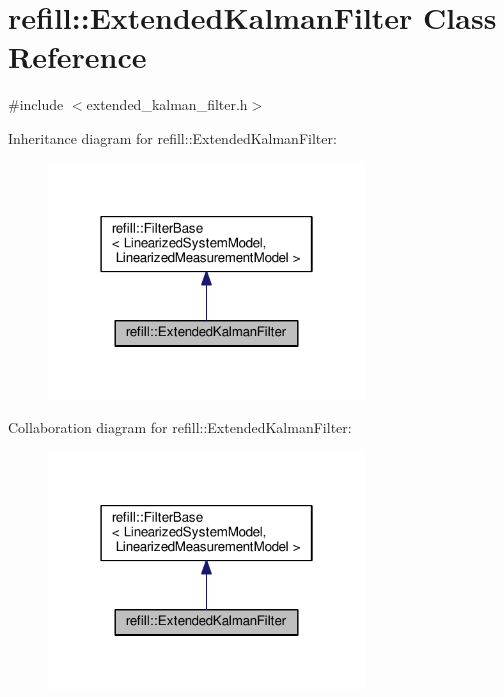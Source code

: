 \hypertarget{classrefill_1_1ExtendedKalmanFilter}{}\section{refill\+:\+:Extended\+Kalman\+Filter Class Reference}
\label{classrefill_1_1ExtendedKalmanFilter}


{\ttfamily \#include $<$extended\+\_\+kalman\+\_\+filter.\+h$>$}



Inheritance diagram for refill\+:\+:Extended\+Kalman\+Filter\+:\nopagebreak
\begin{figure}[H]
\begin{center}
\leavevmode
\includegraphics[width=238pt]{classrefill_1_1ExtendedKalmanFilter__inherit__graph}
\end{center}
\end{figure}


Collaboration diagram for refill\+:\+:Extended\+Kalman\+Filter\+:\nopagebreak
\begin{figure}[H]
\begin{center}
\leavevmode
\includegraphics[width=238pt]{classrefill_1_1ExtendedKalmanFilter__coll__graph}
\end{center}
\end{figure}
